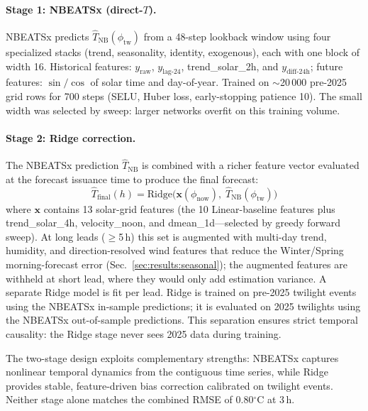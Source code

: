 \documentclass[]{spie}  %
\newcommand{\degC}{$^{\circ}$C}
\begin{document}
\paragraph{Stage 1: NBEATSx (direct-$T$).}
NBEATSx\cite{Olivares2021} predicts $\hat{T}_{\text{NB}}(\phi_{\text{tw}})$ from a 48-step lookback window using four specialized stacks (trend, seasonality, identity, exogenous), each with one block of width 16. Historical features: $y_{\text{raw}}$, $y_{\text{lag-24}}$, trend\_solar\_2h, and $y_{\text{diff-24h}}$; future features: $\sin/\cos$ of solar time and day-of-year. Trained on $\sim$20\,000 pre-2025 grid rows for 700 steps (SELU, Huber loss, early-stopping patience 10). The small width was selected by sweep: larger networks overfit on this training volume.

\paragraph{Stage 2: Ridge correction.}
The NBEATSx prediction $\hat{T}_{\text{NB}}$ is combined with a richer feature vector evaluated at the forecast issuance time to produce the final forecast:
\begin{equation}
\hat{T}_{\text{final}}(h) = \text{Ridge}\bigl(\mathbf{x}(\phi_{\text{now}}),\; \hat{T}_{\text{NB}}(\phi_{\text{tw}})\bigr)
\label{eq:ridge}
\end{equation}
where $\mathbf{x}$ contains 13 solar-grid features (the 10 Linear-baseline features plus trend\_solar\_4h, velocity\_noon, and dmean\_1d---selected by greedy forward sweep). At long leads ($\geq$5\,h) this set is augmented with multi-day trend, humidity, and direction-resolved wind features that reduce the Winter/Spring morning-forecast error (Sec.~\ref{sec:results:seasonal}); the augmented features are withheld at short lead, where they would only add estimation variance. A separate Ridge model is fit per lead. Ridge is trained on pre-2025 twilight events using the NBEATSx in-sample predictions; it is evaluated on 2025 twilights using the NBEATSx out-of-sample predictions. This separation ensures strict temporal causality: the Ridge stage never sees 2025 data during training.

The two-stage design exploits complementary strengths: NBEATSx captures nonlinear temporal dynamics from the contiguous time series, while Ridge provides stable, feature-driven bias correction calibrated on twilight events. Neither stage alone matches the combined RMSE of 0.80\degC{} at 3\,h.

\end{document}

